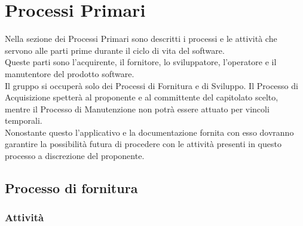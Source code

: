 %



\section{Processi Primari}
Nella sezione dei Processi Primari sono descritti i processi e le attività che servono alle parti prime durante il ciclo di vita del software. \\
Queste parti sono l'acquirente, il fornitore, lo sviluppatore, l'operatore e il manutentore del prodotto software. \\
Il gruppo \groupName{} si occuperà solo dei Processi di Fornitura e di Sviluppo. Il Processo di Acquisizione spetterà al proponente\gloss{} e al committente\gloss{} del capitolato scelto, mentre il Processo di Manutenzione non potrà essere attuato per vincoli temporali. \\
Nonostante questo l'applicativo \projectName{} e la documentazione fornita con esso dovranno garantire la possibilità futura di procedere con le attività presenti in questo processo a discrezione del proponente\gloss{}.

	\subsection{Processo di fornitura}
		\subsubsection{Attività}
		
